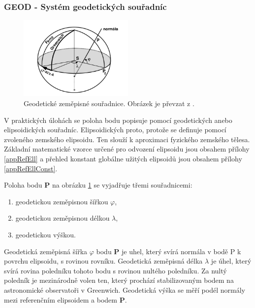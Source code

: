 \documentclass[11pt,a4paper]{article}
\begin{document}
\subsubsection{GEOD - Systém geodetických souřadníc}

\begin{figure}[ht!]
\begin{center}
\includegraphics[width=0.50\textwidth]{FIG/geod_cimb}
\caption{Geodetické zeměpisné souřadnice. Obrázek je převzat z \cite{Cimbalnik1997}.}
\label{fig:geod}
\end{center}
\end{figure}

V praktických úlohách se poloha bodu popisuje pomocí geodetických anebo elipsoidických souřadníc. Elipsoidických proto, protože se definuje pomocí zvoleného zemského elipsoidu. Ten slouží k aproximaci fyzického zemského tělesa. Základní matematické vzorce určené pro odvození elipsoidu jsou obsahem přílohy \ref{appRefEll} a přehled konstant globálne užitých elipsoidů jsou obsahem přílohy \ref{appRefEllConst}.

Poloha bodu \textbf{P} na obrázku \ref{fig:geod} se vyjadřuje třemi souřadnicemi:

\begin{enumerate}
\item geodetickou zeměpisnou šířkou $\varphi$,
\item geodetickou zeměpisnou délkou $\lambda$,
\item geodetickou výškou.
\end{enumerate} 

Geodetická zeměpisná šířka $\varphi$ bodu \textbf{P} je uhel, který svírá normála v bodě P k povrchu elipsoidu, s rovinou rovníku. Geodetická zeměpisná délka $\lambda$ je úhel, který svírá rovina poledníku tohoto bodu s rovinou nultého poledníku. Za nultý poledník je mezinárodně volen ten, který prochází stabilizovaným bodem na astronomické observatoři v Greenwich. Geodetická výška se měří podél normály mezi referenčním elipsoidem a bodem \textbf{P}.
\end{document}

